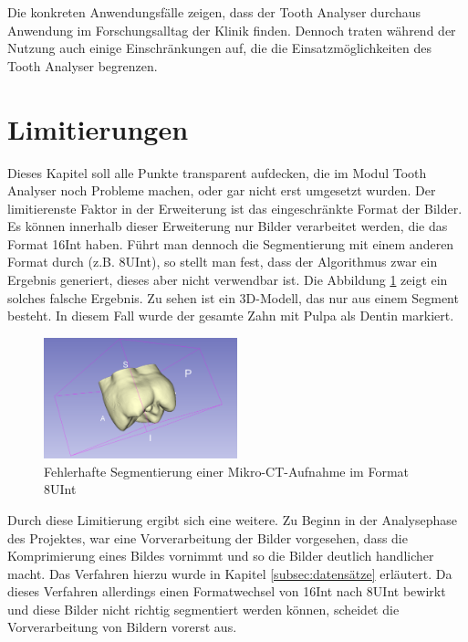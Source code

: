 Die konkreten Anwendungsfälle zeigen, dass der Tooth Analyser durchaus Anwendung
im Forschungsalltag der Klinik finden. Dennoch traten während der Nutzung auch
einige Einschränkungen auf, die die Einsatzmöglichkeiten des Tooth Analyser begrenzen.

\section{Limitierungen}
\label{sec:limitierungen} Dieses Kapitel soll alle Punkte transparent aufdecken,
die im Modul Tooth Analyser noch Probleme machen, oder gar nicht erst umgesetzt wurden.
Der limitierenste Faktor in der Erweiterung ist das eingeschränkte Format der
Bilder. Es können innerhalb dieser Erweiterung nur Bilder verarbeitet werden,
die das Format \ac{16Int} haben. Führt man dennoch die Segmentierung mit einem
anderen Format durch (z.B. \ac{8UInt}), so stellt man fest, dass der Algorithmus
zwar ein Ergebnis generiert, dieses aber nicht verwendbar ist. Die Abbildung
\ref{fig:3d_error} zeigt ein solches falsche Ergebnis. Zu sehen ist ein \ac{3D}-Modell,
das nur aus einem Segment besteht. In diesem Fall wurde der gesamte Zahn mit
Pulpa als Dentin markiert.

\begin{figure}[h]
	\centering
	\includegraphics[width=0.5\textwidth]{img/3d_view_error.png}
	\caption{Fehlerhafte Segmentierung einer Mikro-CT-Aufnahme im Format 8UInt}
	\label{fig:3d_error}
\end{figure}

Durch diese Limitierung ergibt sich eine weitere. Zu Beginn in der Analysephase
des Projektes, war eine Vorverarbeitung der Bilder vorgesehen, dass die
Komprimierung eines Bildes vornimmt und so die Bilder deutlich handlicher macht.
Das Verfahren hierzu wurde in Kapitel \ref{subsec:datensätze} erläutert. Da
dieses Verfahren allerdings einen Formatwechsel von \ac{16Int} nach \ac{8UInt}
bewirkt und diese Bilder nicht richtig segmentiert werden können, scheidet die Vorverarbeitung
von Bildern vorerst aus.

